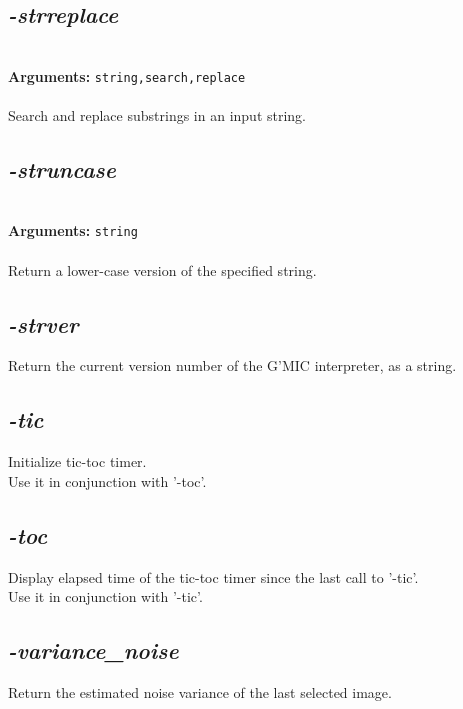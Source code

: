 \documentclass[a4paper,11pt,twoside]{book}
\begin{document}
\subsection{\emph{-strreplace} }\vspace*{-0.5em}
~\\\textbf{Arguments: } 
{\small \texttt{string,search,replace}}\\~\\
Search and replace substrings in an input string.


\subsection{\emph{-struncase} }\vspace*{-0.5em}
~\\\textbf{Arguments: } 
{\small \texttt{string}}\\~\\
Return a lower-case version of the specified string.


\subsection{\emph{-strver} }\vspace*{-0.5em}
Return the current version number of the G'MIC interpreter, as a string.


\subsection{\emph{-tic} }\vspace*{-0.5em}
Initialize tic-toc timer.
~\\Use it in conjunction with '-toc'.


\subsection{\emph{-toc} }\vspace*{-0.5em}
Display elapsed time of the tic-toc timer since the last call to '-tic'.
~\\Use it in conjunction with '-tic'.


\subsection{\emph{-variance\_noise} }\vspace*{-0.5em}
Return the estimated noise variance of the last selected image.
\end{document}
